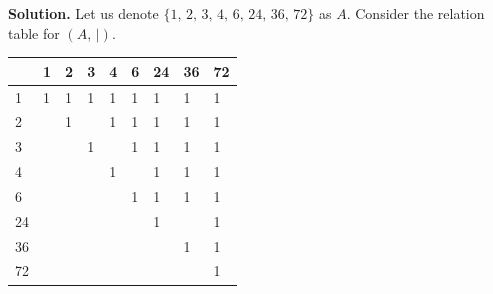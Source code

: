 \documentclass[14pt,a4paper]{extarticle}
\begin{document}
	\noindent\textbf{Solution.} Let us denote $\{1,\, 2,\, 3,\, 4,\, 6,\, 24,\, 36,\, 72\}$ as $A$. Consider the relation table for $(A,\,|)$.
	
	\begin{center}
		\begin{tabu}{ |X[c]|X[c]|X[c]|X[c]|X[c]|X[c]|X[c]|X[c]|X[c]|}
			\hline
			& 1 & 2 & 3 & 4 & 6 & 24 & 36 & 72\\
			 & 1 & 1 & 1 & 1 & 1 & 1 & 1 & 1\\
			 &  & 1 &  & 1 & 1 & 1 & 1 & 1\\
			 &  &  & 1 &  & 1 & 1 & 1 & 1\\
			 &  &  &  & 1 &  & 1 & 1 & 1\\
			 &  &  &  &  & 1 & 1 & 1 & 1\\
			 &  &  &  &  &  & 1 &  & 1\\
			 &  &  &  &  &  &  & 1 & 1\\
			 &  &  &  &  &  &  &  & 1\\
			\hline
		\end{tabu}
	\end{center}
	
\end{document}
